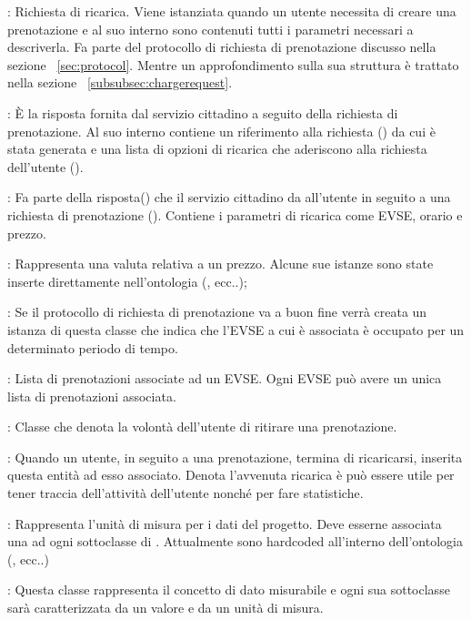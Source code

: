 \begin{description}
	\item {}: Richiesta di ricarica. Viene istanziata quando un utente necessita di creare una prenotazione e al suo interno sono contenuti tutti i parametri necessari a descriverla. Fa parte del protocollo di richiesta di prenotazione discusso nella sezione ~\ref{sec:protocol}. Mentre un approfondimento sulla sua struttura è trattato nella sezione ~\ref{subsubsec:chargerequest}.
	\item {}: È la risposta fornita dal servizio cittadino a seguito della richiesta di prenotazione. Al suo interno contiene un riferimento alla richiesta () da cui è stata generata e una lista di opzioni di ricarica che aderiscono alla richiesta dell'utente ().
	\item {}: Fa parte della risposta() che il servizio cittadino da all'utente in seguito a una richiesta di prenotazione (). Contiene i parametri di ricarica come EVSE, orario e prezzo. 
	\item {}: Rappresenta una valuta relativa a un prezzo. Alcune sue istanze sono state inserte direttamente nell'ontologia (,  ecc..);
	\item {}: Se il protocollo di richiesta di prenotazione va a buon fine verrà creata un istanza di questa classe che indica che l'EVSE a cui è associata è occupato per un determinato periodo di tempo. 
	\item {}: Lista di prenotazioni associate ad un EVSE. Ogni EVSE può avere un unica lista di prenotazioni associata.
	\item {}: Classe che denota la volontà dell'utente di ritirare una prenotazione.
	\item {}: Quando un utente, in seguito a una prenotazione, termina di ricaricarsi, inserita questa entità ad esso associato. Denota l'avvenuta ricarica è può essere utile per tener traccia dell'attività dell'utente nonché per fare statistiche.
	\item {}: Rappresenta l'unità di misura per i dati del progetto. Deve esserne associata una ad ogni sottoclasse di . Attualmente sono hardcoded all'interno dell'ontologia (,  ecc..) 	
	\item {}: Questa classe rappresenta il concetto di dato misurabile e ogni sua sottoclasse sarà caratterizzata da un valore e da un unità di misura.
\end{description}

